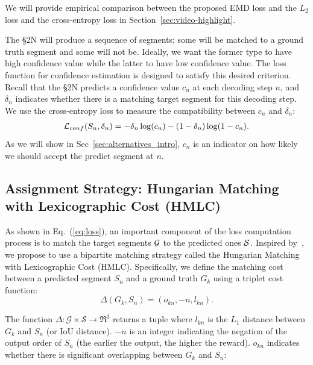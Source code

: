 \documentclass[10pt,journal,compsoc]{IEEEtran}
\begin{document}
We will provide empirical comparison between the proposed EMD loss and the $L_2$ loss and the  cross-entropy loss in Section~\ref{sec:video-highlight}.

 The \S2N will produce a sequence of segments; some will be matched to a ground truth segment and some will not be. Ideally, we want the former type to have high confidence value while the latter to have low confidence value. The loss function for confidence estimation is designed to satisfy this desired criterion. 
Recall that the \S2N predicts a confidence value $c_n$ at each decoding step $n$, and $\delta_n$ indicates whether there is a matching target segment for this decoding step. We use the cross-entropy loss to measure the compatibility between $c_n$ and $\delta_n$: 
\begin{align}
\mathcal{L}_{conf}(S_n, \delta_n) = - \delta_n\log(c_n) -  (1- \delta_n)\log(1 - c_n).
\end{align}
As we will show in Sec~\ref{sec:alternatives_intro}, $c_n$ is an indicator on how likely we should accept the predict segment at $n$.
 


\subsection{Assignment Strategy: Hungarian Matching with Lexicographic Cost (HMLC)~\label{sec:HMLC}} 

As shown in Eq.~(\ref{eq:loss}), an important component of the loss computation process is to match the target segments $\mathcal{G}$ to the predicted ones $\mathcal{S}$. Inspired by~\cite{stewart2016end}, we propose to use a bipartite matching strategy called the Hungarian Matching with Lexicographic Cost (HMLC). Specifically, we define the matching cost between a predicted segment $S_n$ and a ground truth $G_k$ using a triplet cost function:
\begin{equation}
\Delta (G_k, S_n) = (o_{kn}, -n, l_{kn}).\label{eq:assign}
\end{equation}

The function $\Delta: \mathcal{G} \times \mathcal{S} \rightarrow \Re^3$ returns a tuple where $l_{kn}$ is the $L_1$ distance between $G_k$ and $S_n$ (or IoU distance). $-n$ is an integer indicating the negation of the output order of $S_n$ (the earlier the output, the higher the reward).
$o_{kn}$ indicates whether there is significant overlapping between $G_k$ and $S_n$: 
\end{document}
